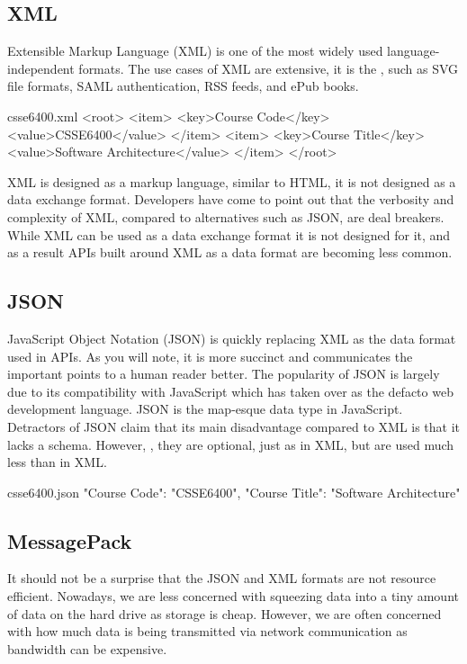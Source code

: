 \documentclass{csse4400}
\begin{document}
\subsection{XML}
Extensible Markup Language (XML) is one of the most widely used language-independent formats.
The use cases of XML are extensive,
it is the ,
such as SVG file formats, SAML authentication, RSS feeds, and ePub books.
\begin{code}[language=xml]{csse6400.xml}
<root>
  <item>
    <key>Course Code</key>
    <value>CSSE6400</value>
  </item>
  <item>
    <key>Course Title</key>
    <value>Software Architecture</value>
  </item>
</root>
\end{code}

XML is designed as a markup language, similar to HTML,
it is not designed as a data exchange format.
Developers have come to point out that the verbosity and complexity of XML,
compared to alternatives such as JSON, are deal breakers.
While XML can be used as a data exchange format it is not designed for it,
and as a result APIs built around XML as a data format are becoming less common.

\subsection{JSON}
JavaScript Object Notation (JSON) is quickly replacing XML as the data format used in APIs.
As you will note, it is more succinct and communicates the important points to a human reader better.
The popularity of JSON is largely due to its compatibility with JavaScript which has taken over as the defacto web development language.
JSON is the map-esque data type in JavaScript.
Detractors of JSON claim that its main disadvantage compared to XML is that it lacks a schema.
However, ,
they are optional, just as in XML, but are used much less than in XML.

\begin{code}[language=json]{csse6400.json}
{
    "Course Code": "CSSE6400",
    "Course Title": "Software Architecture"
}
\end{code}

\subsection{MessagePack}
It should not be a surprise that the JSON and XML formats are not resource efficient.
Nowadays, we are less concerned with squeezing data into a tiny amount of data on the hard drive as storage is cheap.
However, we are often concerned with how much data is being transmitted via network communication as bandwidth can be expensive.
\end{document}
